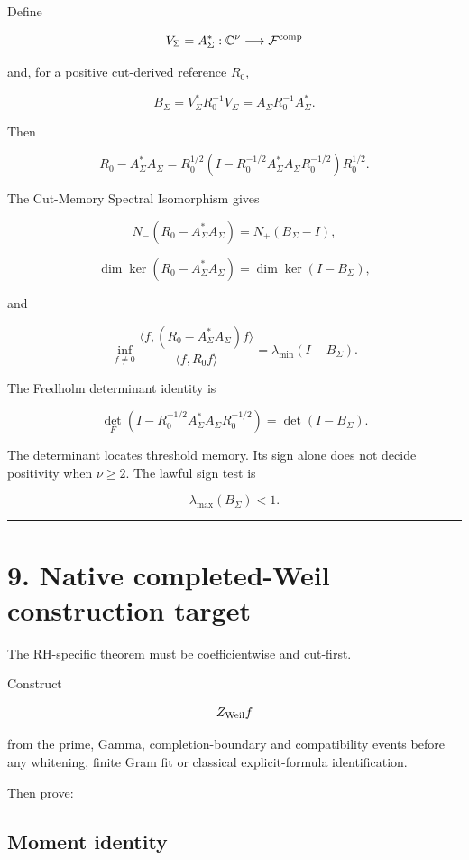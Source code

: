 Define

\[
V_\Sigma=A_\Sigma^*:
\mathbb C^\nu\longrightarrow\mathcal F^{\rm comp}
\]

and, for a positive cut-derived reference \(R_0\),

\[
B_\Sigma
=V_\Sigma^*R_0^{-1}V_\Sigma
=A_\Sigma R_0^{-1}A_\Sigma^*.
\]

Then

\[
R_0-A_\Sigma^*A_\Sigma
=R_0^{1/2}
\left(
I-R_0^{-1/2}A_\Sigma^*A_\Sigma R_0^{-1/2}
\right)
R_0^{1/2}.
\]

The Cut-Memory Spectral Isomorphism gives

\[
N_-(R_0-A_\Sigma^*A_\Sigma)
=N_+(B_\Sigma-I),
\]

\[
\dim\ker(R_0-A_\Sigma^*A_\Sigma)
=\dim\ker(I-B_\Sigma),
\]

and

\[
\inf_{f\ne0}
\frac{\langle f,(R_0-A_\Sigma^*A_\Sigma)f\rangle}
     {\langle f,R_0f\rangle}
=
\lambda_{\min}(I-B_\Sigma).
\]

The Fredholm determinant identity is

\[
\det_F
\left(
I-R_0^{-1/2}A_\Sigma^*A_\Sigma R_0^{-1/2}
\right)
=
\det(I-B_\Sigma).
\]

The determinant locates threshold memory. Its sign alone does not decide
positivity when \(\nu\ge2\). The lawful sign test is

\[
\lambda_{\max}(B_\Sigma)<1.
\]

\begin{center}\rule{0.5\linewidth}{0.5pt}\end{center}

\hypertarget{native-completed-weil-construction-target}{%
\section{9. Native completed-Weil construction target}\label{native-completed-weil-construction-target}}

The RH-specific theorem must be coefficientwise and cut-first.

Construct

\[
Z_{\rm Weil}f
\]

from the prime, Gamma, completion-boundary and compatibility events before any
whitening, finite Gram fit or classical explicit-formula identification.

Then prove:

\hypertarget{moment-identity}{%
\subsection{Moment identity}\label{moment-identity}}

